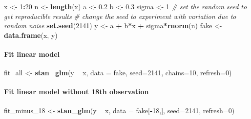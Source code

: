 \documentclass[
]{article}
\newenvironment{Shaded}{\begin{snugshade}}{\end{snugshade}}
\newcommand{\CommentTok}[1]{\textcolor[rgb]{0.56,0.35,0.01}{\textit{#1}}}
\newcommand{\DataTypeTok}[1]{\textcolor[rgb]{0.13,0.29,0.53}{#1}}
\newcommand{\DecValTok}[1]{\textcolor[rgb]{0.00,0.00,0.81}{#1}}
\newcommand{\FloatTok}[1]{\textcolor[rgb]{0.00,0.00,0.81}{#1}}
\newcommand{\KeywordTok}[1]{\textcolor[rgb]{0.13,0.29,0.53}{\textbf{#1}}}
\newcommand{\NormalTok}[1]{#1}
\newcommand{\OperatorTok}[1]{\textcolor[rgb]{0.81,0.36,0.00}{\textbf{#1}}}
\newcommand{\StringTok}[1]{\textcolor[rgb]{0.31,0.60,0.02}{#1}}
\begin{document}
\begin{Shaded}
\begin{Highlighting}[]
\NormalTok{x <-}\StringTok{ }\DecValTok{1}\OperatorTok{:}\DecValTok{20}
\NormalTok{n <-}\StringTok{ }\KeywordTok{length}\NormalTok{(x)}
\NormalTok{a <-}\StringTok{ }\FloatTok{0.2}
\NormalTok{b <-}\StringTok{ }\FloatTok{0.3}
\NormalTok{sigma <-}\StringTok{ }\DecValTok{1}
\CommentTok{# set the random seed to get reproducible results}
\CommentTok{# change the seed to experiment with variation due to random noise}
\KeywordTok{set.seed}\NormalTok{(}\DecValTok{2141}\NormalTok{) }
\NormalTok{y <-}\StringTok{ }\NormalTok{a }\OperatorTok{+}\StringTok{ }\NormalTok{b}\OperatorTok{*}\NormalTok{x }\OperatorTok{+}\StringTok{ }\NormalTok{sigma}\OperatorTok{*}\KeywordTok{rnorm}\NormalTok{(n)}
\NormalTok{fake <-}\StringTok{ }\KeywordTok{data.frame}\NormalTok{(x, y)}
\end{Highlighting}
\end{Shaded}

\hypertarget{fit-linear-model}{%
\paragraph{Fit linear model}\label{fit-linear-model}}

\begin{Shaded}
\begin{Highlighting}[]
\NormalTok{fit_all <-}\StringTok{ }\KeywordTok{stan_glm}\NormalTok{(y }\OperatorTok{~}\StringTok{ }\NormalTok{x, }\DataTypeTok{data =}\NormalTok{ fake, }\DataTypeTok{seed=}\DecValTok{2141}\NormalTok{, }\DataTypeTok{chains=}\DecValTok{10}\NormalTok{, }\DataTypeTok{refresh=}\DecValTok{0}\NormalTok{)}
\end{Highlighting}
\end{Shaded}

\hypertarget{fit-linear-model-without-18th-observation}{%
\paragraph{Fit linear model without 18th
observation}\label{fit-linear-model-without-18th-observation}}

\begin{Shaded}
\begin{Highlighting}[]
\NormalTok{fit_minus_}\DecValTok{18}\NormalTok{ <-}\StringTok{ }\KeywordTok{stan_glm}\NormalTok{(y }\OperatorTok{~}\StringTok{ }\NormalTok{x, }\DataTypeTok{data =}\NormalTok{ fake[}\OperatorTok{-}\DecValTok{18}\NormalTok{,], }\DataTypeTok{seed=}\DecValTok{2141}\NormalTok{, }\DataTypeTok{refresh=}\DecValTok{0}\NormalTok{)}
\end{Highlighting}
\end{Shaded}
\end{document}
